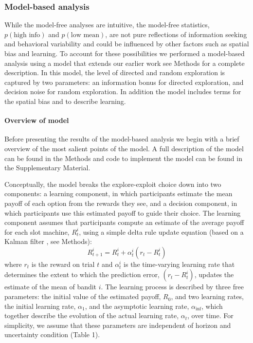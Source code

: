 \documentclass[12pt]{article}
\begin{document}
\subsubsection*{Model-based analysis}
While the model-free analyses are intuitive, the model-free statistics, $p(\mbox{high info})$ and $p(\mbox{low mean})$, are not pure reflections of information seeking and behavioral variability and could be influenced by other factors such as spatial bias and learning.  To account for these possibilities we performed a model-based analysis using a model that extends our earlier work \cite{Wilson2014-ob,Somerville2017-fq,kruegerEtAl2017} see Methods for a complete description.  In this model, the level of directed and random exploration is captured by two parameters: an information bonus for directed exploration, and decision noise for random exploration. In addition the model includes terms for the spatial bias and to describe learning.  

\paragraph{Overview of model}
Before presenting the results of the model-based analysis we begin with a brief overview of the most salient points of the model.  A full description of the model can be found in the Methods and code to implement the model can be found in the Supplementary Material.  

Conceptually, the model breaks the explore-exploit choice down into two components: a learning component, in which participants estimate the mean payoff of each option from the rewards they see, and a decision component, in which participants use this estimated payoff to guide their choice.  The learning component assumes that participants compute an estimate of the average payoff for each slot machine, $R^i_t$, using a simple delta rule update equation (based on a Kalman filter \cite{Kalman1960-uo}, see Methods):
\begin{equation}
R^i_{t+1}= R^i_t + \alpha_t^i (r_t - R^i_t)
\end{equation}
where $r_t$ is the reward on trial $t$ and $\alpha_t^i$ is the time-varying learning rate that determines the extent to which the prediction error, $(r_t - R^i_t)$, updates the estimate of the mean of bandit $i$. The learning process is described by three free parameters: the initial value of the estimated payoff, $R_0$, and two learning rates, the initial learning rate, $\alpha_1$, and the asymptotic learning rate, $\alpha_{\inf}$, which together describe the evolution of the actual learning rate, $\alpha_t$, over time. For simplicity, we assume that these parameters are independent of horizon and uncertainty condition (Table 1).
\end{document}
